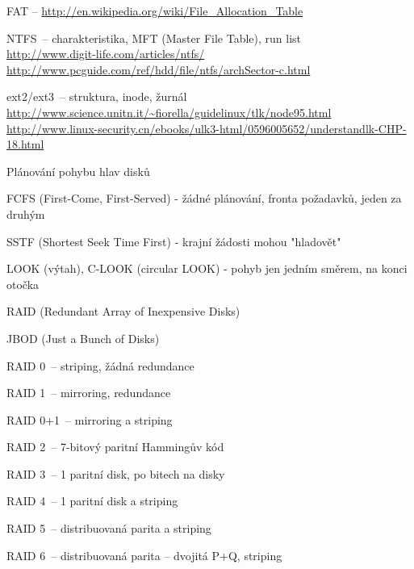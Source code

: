 \begin{priklady}
  \begin{pitemize}
    \item FAT -- \url{http://en.wikipedia.org/wiki/File\_Allocation\_Table}
    \item NTFS~-- charakteristika, MFT (Master File Table), run list\\\url{http://www.digit-life.com/articles/ntfs/}\\\url{http://www.pcguide.com/ref/hdd/file/ntfs/archSector-c.html}
    \item ext2/ext3~-- struktura, inode, žurnál\\\url{http://www.science.unitn.it/~fiorella/guidelinux/tlk/node95.html}\\\url{http://www.linux-security.cn/ebooks/ulk3-html/0596005652/understandlk-CHP-18.html}
  \end{pitemize}
\end{priklady}

\begin{obecne}{Plánování pohybu hlav disků}
  \begin{pitemize}
    \item FCFS (First-Come, First-Served) - žádné plánování, fronta požadavků, jeden za druhým
    \item SSTF (Shortest Seek Time First) - krajní žádosti mohou "hladovět"
    \item LOOK (výtah), C-LOOK (circular LOOK) - pohyb jen jedním směrem, na konci otočka 
  \end{pitemize}
\end{obecne}

\begin{obecne}{RAID (Redundant Array of Inexpensive Disks)}
  \begin{pitemize}
    \item JBOD (Just a Bunch of Disks)
    \item RAID 0~-- striping, žádná redundance
    \item RAID 1~-- mirroring, redundance
    \item RAID 0+1~-- mirroring a striping
    \item RAID 2~-- 7-bitový paritní Hammingův kód
    \item RAID 3~-- 1 paritní disk, po bitech na disky
    \item RAID 4~-- 1 paritní disk a striping
    \item RAID 5~-- distribuovaná parita a striping
    \item RAID 6~-- distribuovaná parita -- dvojitá P+Q, striping 
  \end{pitemize}
\end{obecne}
